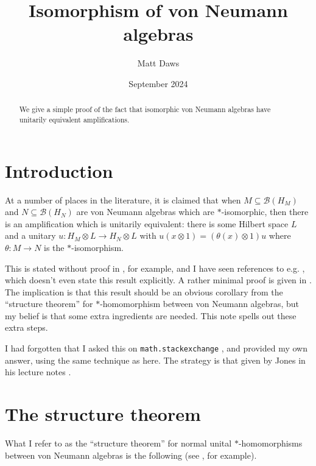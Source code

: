 \documentclass[a4paper,11pt]{article}
\theoremstyle{plain}
\theoremstyle{remark}
\newcommand{\mc}[1]{\mathcal{#1}}
\begin{document}
\title{Isomorphism of von Neumann algebras}
\author{Matt Daws}
\date{September 2024}
\maketitle

\begin{abstract}
We give a simple proof of the fact that isomorphic von Neumann algebras have unitarily equivalent amplifications.
\end{abstract}

\section{Introduction}

At a number of places in the literature, it is claimed that when $M\subseteq\mc B(H_M)$ and $N\subseteq\mc B(H_N)$ are von Neumann algebras which are $*$-isomorphic, then there is an amplification which is unitarily equivalent: there is some Hilbert space $L$ and a unitary $u\colon H_M\otimes L \to H_N\otimes L$ with $u(x\otimes 1) = (\theta(x)\otimes 1)u$ where $\theta \colon M\to N$ is the $*$-isomorphism.

This is stated without proof in \cite[Theorem~III.2.2.8]{Blackadar_OperatorAlgebrasBook}, for example, and I have seen references to e.g. \cite[Theorem~IV.5.5]{TakesakiI}, which doesn't even state this result explicitly.  A rather minimal proof is given in \cite[Theorem~2.4.26]{BR_OpAlgBook_1}.  The implication is that this result should be an obvious corollary from the ``structure theorem'' for $*$-homomorphism between von Neumann algebras, but my belief is that some extra ingredients are needed.  This note spells out these extra steps.

I had forgotten that I asked this on \texttt{math.stackexchange} \cite{4728018}, and provided my own answer, using the same technique as here.  The strategy is that given by Jones in his lecture notes \cite[Theorem~7.2.1]{JonesNotes}.

\section{The structure theorem}

What I refer to as the ``structure theorem'' for normal unital $*$-homomorphisms between von Neumann algebras is the following (see \cite[Theorem~III.2.2.8]{Blackadar_OperatorAlgebrasBook},  \cite[Theorem~IV.5.5]{TakesakiI} for example).
\end{document}

